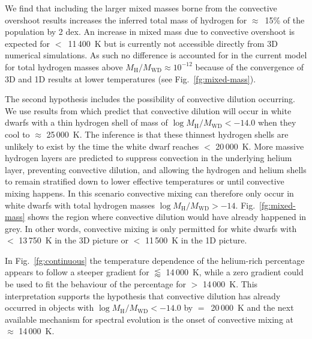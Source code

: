 \documentclass[a4paper,fleqn,usenatbib]{mnras}
\begin{document}
We find that including the larger mixed masses borne from the convective overshoot results increases the inferred total mass of hydrogen for $\approx$~15\% of the population by 2 dex. An increase in mixed mass due to convective overshoot is expected for \teff$<$~11\,400~K but is currently not accessible directly from 3D numerical simulations. As such no difference is accounted for in the current model for total hydrogen masses above $M_{\mathrm{H}}/M_{\mathrm{WD}} \approx 10^{-12}$ because of the convergence of 3D and 1D results at lower temperatures (see Fig.~\ref{fg:mixed-mass}). 

The second hypothesis includes the possibility of convective dilution occurring. We use results from \citet{genest-Beaulieu19} which predict that convective dilution will occur in white dwarfs with a thin hydrogen shell of mass of $\log M_{\mathrm{H}}/M_{\mathrm{WD}}<-14.0$ when they cool to \teff$\approx$ 25\,000~K. The inference is that these thinnest hydrogen shells are unlikely to exist by the time the white dwarf reaches \teff$<$ 20\,000~K. More massive hydrogen layers are predicted to suppress convection in the underlying helium layer, preventing convective dilution, and allowing the hydrogen and helium shells to remain stratified down to lower effective temperatures or until convective mixing happens. In this scenario convective mixing can therefore only occur in white dwarfs with total hydrogen masses $\log M_{\mathrm{H}}/M_{\mathrm{WD}}>-14$. Fig.~\ref{fg:mixed-mass} shows the region where convective dilution would have already happened in grey. In other words, convective mixing is only permitted for white dwarfs with \teff$<$ 13\,750~K in the 3D picture or \teff$<$ 11\,500~K in the 1D picture. 

In Fig.~\ref{fg:continuous} the temperature dependence of the helium-rich percentage appears to follow a steeper gradient for \teff$\lessapprox$ 14\,000~K, while a zero gradient could be used to fit the behaviour of the percentage for \teff$>$ 14\,000~K. This interpretation supports the hypothesis that convective dilution has already occurred in objects with $\log M_{\mathrm{H}}/M_{\mathrm{WD}}<-14.0$ by \teff$=$~20\,000~K and the next available mechanism for spectral evolution is the onset of convective mixing at \teff$\approx$ 14\,000~K. 
\end{document}
